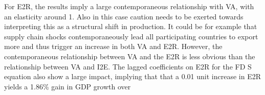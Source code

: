 \documentclass[a4paper]{article}
\begin{document}
For E2R, the results imply a large contemporaneous relationship with VA, with an elasticity around 1. Also in this case caution needs to be exerted towards interpreting this as a structural shift in production. It could be for example that supply chain shocks contemporaneously lead all participating countries to export more and thus trigger an increase in both VA and E2R. However, the contemporaneous relationship between VA and the E2R is less obvious than the relationship between VA and I2E. The lagged coefficients on E2R for the FD S equation also show a large impact, implying that that a 0.01 unit increase in E2R yields a 1.86\% gain in GDP growth over

\begin{table}[h!]
\centering
\caption{\label{tab:VAGRREG} \textsc{Value Added Regressions}}
\end{table}
\end{document}
